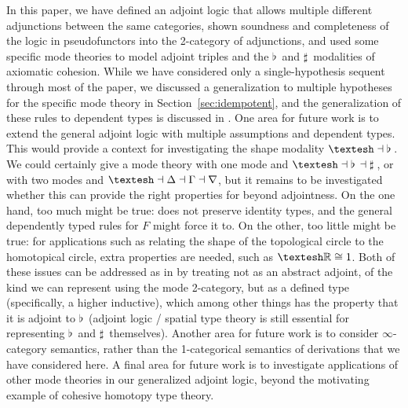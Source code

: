 \documentclass{drl-common/llncs}
\newcommand{\la}{\ensuremath{\dashv}}
\newcommand{\sh}{\text{\textesh}}
\newcommand\Flat[1]{\ensuremath{\flat \, {#1}}}
\newcommand\Sharp[1]{\ensuremath{\sharp \, {#1}}}
\begin{document}
In this paper, we have defined an adjoint logic that allows multiple
different adjunctions between the same categories, shown soundness and
completeness of the logic in pseudofunctors into the 2-category of
adjunctions, and used some specific mode theories to model adjoint
triples and the $\Flat{}$ and $\Sharp{}$ modalities of axiomatic
cohesion.  While we have considered only a single-hypothesis sequent
through most of the paper, we discussed a generalization to multiple
hypotheses for the specific mode theory in Section~\ref{sec:idempotent},
and the generalization of these rules to dependent types is discussed in
\citet{shulman15realcohesion}.  One area for future work is to extend
the general adjoint logic with multiple assumptions and dependent types.
This would provide a context for investigating the shape modality $\sh{}
\la \Flat{}$.  We could certainly give a mode theory with one mode and
$\sh{} \la \Flat{} \la \Sharp{}$, or with two modes and $\sh \la \Delta
\la \Gamma \la \nabla$, but it remains to be investigated whether this
can provide the right properties for \sh{} beyond adjointness.  On the
one hand, too much might be true: \sh{} does not preserve identity
types, and the general dependently typed rules for $F$ might force it
to. On the other, too little might be true: for applications such as
relating the shape of the topological circle to the homotopical circle,
extra properties are needed, such as $\sh{\mathbb{R}} \cong 1$.  Both of
these issues can be addressed as in \citep{shulman15realcohesion} by
treating \sh{} not as an abstract adjoint, of the kind we can represent
using the mode 2-category, but as a defined type (specifically, a higher
inductive), which among other things has the property that it is adjoint
to $\Flat{}$ (adjoint logic / spatial type theory is still essential for
representing $\Flat{}$ and $\Sharp{}$ themselves).  Another area for
future work is to consider $\infty$-category semantics, rather than the
1-categorical semantics of derivations that we have considered here.  A
final area for future work is to investigate applications of other mode
theories in our generalized adjoint logic, beyond the motivating
example of cohesive homotopy type theory.

\setlength{\bibsep}{-1.75pt} %
{ \small
\linespread{0.50}


}
\end{document}
